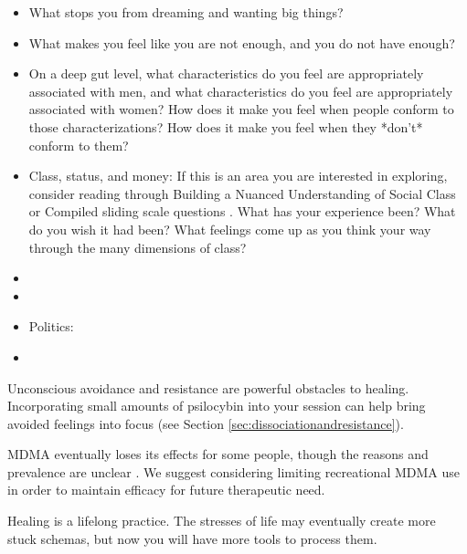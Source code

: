 \documentclass[12pt,letterpaper]{article}
\begin{document}
\begin{itemize}
    \item What stops you from dreaming and wanting big things?
    \item What makes you feel like you are not enough, and you do not have enough?
    \item On a deep gut level, what characteristics do you feel are appropriately associated with men, and what characteristics do you feel are appropriately associated with women? How does it make you feel when people conform to those characterizations? How does it make you feel when they *don't* conform to them?
    \item Class, status, and money: If this is an area you are interested in exploring, consider reading through Building a Nuanced Understanding of Social Class or Compiled sliding scale questions . What has your experience been? What do you wish it had been? What feelings come up as you think your way through the many dimensions of class?
    \item {}
    \item {}
    \item Politics: 
    \item {}
\end{itemize}
Unconscious avoidance and resistance are powerful obstacles to healing. Incorporating small amounts of psilocybin into your session can help bring avoided feelings into focus (see Section \ref{sec:dissociationandresistance}).

MDMA eventually loses its effects for some people, though the reasons and prevalence are unclear \cite{parrottTolerance}. We suggest considering limiting recreational MDMA use in order to maintain efficacy for future therapeutic need.

Healing is a lifelong practice. The stresses of life may eventually create more stuck schemas, but now you will have more tools to process them.
\end{document}
